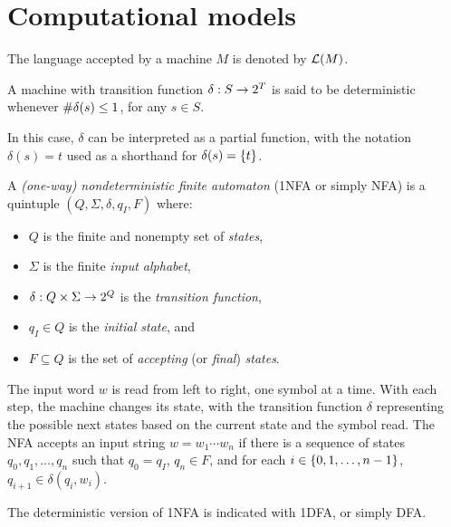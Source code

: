 \chapter{Computational models}
The language accepted by a machine $M$ is denoted by $\mathcal L(M)$.


\begin{defn}
	A machine with transition function $\delta:S\to2^{T}$ is said to be deterministic whenever $\# \delta(s)\le1$, for any $s\in S$.

	In this case, $\delta$ can be interpreted as a partial function, with the notation $\delta(s)=t$ used as a shorthand for $\delta(s)=\{t\}$.
\end{defn}

\begin{defn}
	A \emph{(one-way) nondeterministic finite automaton} (1NFA or simply NFA) is a quintuple $(Q,\Sigma,\delta,q_I,F)$ where:
	\begin{itemize}
		\item $Q$ is the finite and nonempty set of \emph{states},
		\item $\Sigma$ is the finite \emph{input alphabet},
		\item $\delta:Q\times\Sigma\to2^{Q}$ is the \emph{transition function},
		\item $q_I\in Q$ is the \emph{initial state}, and
		\item $F\subseteq Q$ is the set of \emph{accepting} (or \emph{final}) \emph{states}.
	\end{itemize}
	The input word $w$ is read from left to right, one symbol at a time.
	With each step, the machine changes its state, with the transition function $\delta$ representing the possible next states based on the current state and the symbol read.
	The NFA accepts an input string $w=w_1\cdots w_n$ if there is a sequence of states $q_0,q_1,\dots,q_n$ such that $q_0=q_I$, $q_n\in F$, and for each $i\in\{0,1,\dots,n-1\}$, $q_{i+1}\in\delta(q_i,w_i)$.

	The deterministic version of 1NFA is indicated with 1DFA, or simply DFA.
\end{defn}



